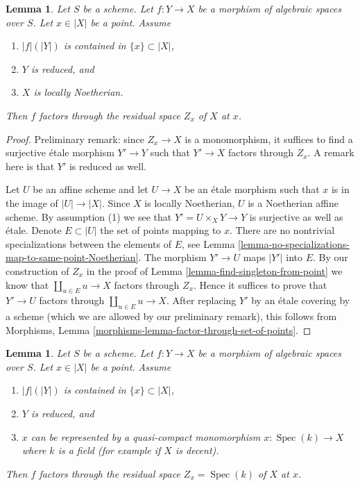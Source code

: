 \documentclass{stacks-project}
\theoremstyle{plain}
\newtheorem{lemma}[subsection]{Lemma}
\theoremstyle{definition}
\theoremstyle{remark}
\numberwithin{equation}{subsection}
\def\Spec{\mathop{\mathrm{Spec}}}
\begin{document}
\begin{lemma}
\label{lemma-factor-through-residual-space-Noetherian}
Let $S$ be a scheme. Let $f : Y \to X$ be a morphism of algebraic
spaces over $S$. Let $x \in |X|$ be a point. Assume
\begin{enumerate}
\item $|f|(|Y|)$ is contained in $\{x\} \subset |X|$,
\item $Y$ is reduced, and
\item $X$ is locally Noetherian.
\end{enumerate}
Then $f$ factors through the residual space $Z_x$ of $X$ at $x$.
\end{lemma}

\begin{proof}
Preliminary remark: since $Z_x \to X$ is a monomorphism, it suffices to find
a surjective \'etale morphism $Y' \to Y$ such that $Y' \to X$
factors through $Z_x$. A remark here is that $Y'$ is reduced as well.

\medskip\noindent
Let $U$ be an affine scheme and let $U \to X$ be an \'etale morphism
such that $x$ is in the image of $|U| \to |X|$. Since $X$ is locally
Noetherian, $U$ is a Noetherian affine scheme. By assumption (1)
we see that $Y' = U \times_X Y \to Y$ is surjective as well as \'etale.
Denote $E \subset |U|$ the set of points mapping to $x$.
There are no nontrivial specializations between the elements of $E$, see
Lemma \ref{lemma-no-specializations-map-to-same-point-Noetherian}.
The morphism $Y' \to U$ maps $|Y'|$ into $E$. By our construction
of $Z_x$ in the proof of Lemma \ref{lemma-find-singleton-from-point}
we know that $\coprod_{u \in E} u \to X$ factors through $Z_x$.
Hence it suffices to prove that $Y' \to U$ factors through
$\coprod_{u \in E} u \to X$. After replacing $Y'$ by an \'etale covering
by a scheme (which we are allowed by our preliminary remark), this follows
from Morphisms, Lemma \ref{morphisms-lemma-factor-through-set-of-points}.
\end{proof}

\begin{lemma}
\label{lemma-factor-through-residual-space-decent}
Let $S$ be a scheme. Let $f : Y \to X$ be a morphism of algebraic
spaces over $S$. Let $x \in |X|$ be a point. Assume
\begin{enumerate}
\item $|f|(|Y|)$ is contained in $\{x\} \subset |X|$,
\item $Y$ is reduced, and
\item $x$ can be represented by a quasi-compact monomorphism
$x : \Spec(k) \to X$ where $k$ is a field (for example if $X$ is decent).
\end{enumerate}
Then $f$ factors through
the residual space $Z_x = \Spec(k)$ of $X$ at $x$.
\end{lemma}
\end{document}
